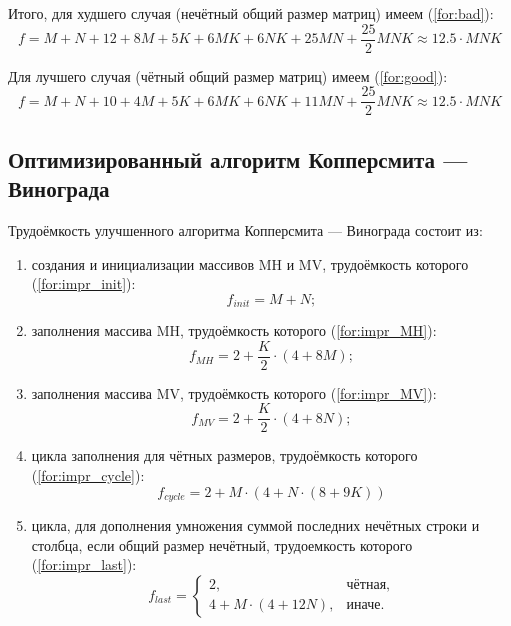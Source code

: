 Итого, для худшего случая (нечётный общий размер матриц) имеем (\ref{for:bad}):
\begin{equation}
    \label{for:bad}
    f = M + N + 12 + 8M + 5K + 6MK + 6NK + 25MN + \frac{25}{2}MNK \approx 12.5 \cdot MNK
\end{equation}

Для лучшего случая (чётный общий размер матриц) имеем (\ref{for:good}):
\begin{equation}
    \label{for:good}
    f = M + N + 10 + 4M + 5K + 6MK + 6NK + 11MN + \frac{25}{2}MNK \approx 12.5 \cdot MNK
\end{equation}

\subsection{Оптимизированный алгоритм Копперсмита — Винограда}

Трудоёмкость улучшенного алгоритма Копперсмита — Винограда состоит из:
\begin{enumerate}
    \item создания и инициализации массивов MH и MV, трудоёмкость которого (\ref{for:impr_init}):
        \begin{equation}
            \label{for:impr_init}
            f_{init} = M + N;
        \end{equation}

    \item заполнения массива MH, трудоёмкость которого (\ref{for:impr_MH}):
        \begin{equation}
            \label{for:impr_MH}
            f_{MH} = 2 + \frac{K}{2} \cdot (4 + 8M);
        \end{equation}

    \item заполнения массива MV, трудоёмкость которого (\ref{for:impr_MV}):
        \begin{equation}
            \label{for:impr_MV}
            f_{MV} = 2 + \frac{K}{2} \cdot (4 + 8N);
        \end{equation}

    \item цикла заполнения для чётных размеров, трудоёмкость которого (\ref{for:impr_cycle}):
        \begin{equation}
            \label{for:impr_cycle}
            f_{cycle} = 2 + M \cdot (4 + N \cdot (8 + 9K))
        \end{equation}

    \item цикла, для дополнения умножения суммой последних нечётных строки и столбца, если общий размер нечётный, трудоемкость которого (\ref{for:impr_last}):
        \begin{equation}
            \label{for:impr_last}
                f_{last} = 
                \begin{cases}
                    2, & \text{чётная,}\\
                    4 + M \cdot (4 + 12N), & \text{иначе.}
            \end{cases}
        \end{equation}
\end{enumerate}

